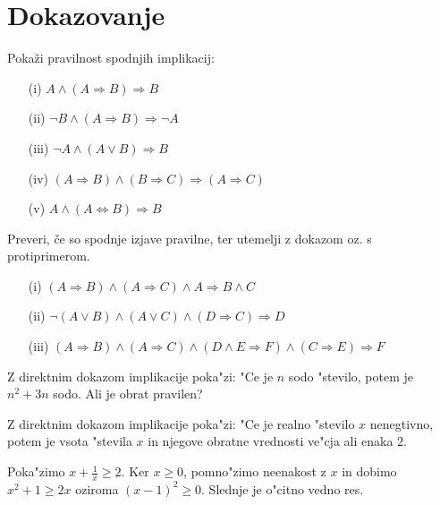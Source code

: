 \documentclass[11pt,paper=b5,footinclude,headinclude]{scrbook} %
\newtheorem{ex}{Vaja\hypertarget{sol:\theex}}[chapter]
\begin{document}
\section{Dokazovanje}

\begin{ex}
Pokaži pravilnost spodnjih implikacij:
\begin{enumerate}
\item[(i)] $A \wedge (A \Rightarrow B) \Rightarrow B$
\item[(ii)] $\neg B \wedge (A \Rightarrow B) \Rightarrow \neg A$
\item[(iii)] $\neg A \wedge (A \vee B) \Rightarrow B$
\item[(iv)] $(A \Rightarrow B) \wedge (B \Rightarrow C) \Rightarrow (A \Rightarrow C)$
\item[(v)] $A \wedge (A \Leftrightarrow B) \Rightarrow B$
\end{enumerate}



\end{ex} \begin{ex} Preveri, če so spodnje izjave pravilne, ter utemelji z dokazom oz. s protiprimerom.
\begin{enumerate}
\item[(i)] $(A \Rightarrow B ) \wedge (A \Rightarrow C) \wedge A \Rightarrow B \wedge C$
\item[(ii)] $\neg (A \vee B) \wedge (A\vee C) \wedge (D\Rightarrow C) \Rightarrow D$
\item[(iii)] $(A\Rightarrow B) \wedge (A\Rightarrow C) \wedge (D\wedge E \Rightarrow F) \wedge (C\Rightarrow E) \Rightarrow F$
\end{enumerate}

\end{ex} \begin{ex} Z direktnim dokazom implikacije poka"zi: "Ce je $n$ sodo "stevilo, potem je $n^2 +3n$ sodo. Ali je obrat pravilen? 

\end{ex} \begin{ex} Z direktnim dokazom implikacije poka"zi: "Ce je realno "stevilo $x$ nenegtivno, potem je vsota  "stevila $x$  in njegove obratne vrednosti  ve"cja ali enaka $2$.

\begin{sol}
    Poka"zimo $x + \frac{1}{x}\geq 2$. Ker $x\geq 0$, pomno"zimo neenakost z $x$ in dobimo
$x^2 + 1 \geq 2x$ oziroma $(x- 1)^2\geq 0$. Slednje je o"citno vedno res.
\end{sol}


\end{ex}
\end{document}
